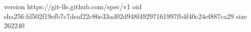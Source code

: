 version https://git-lfs.github.com/spec/v1
oid sha256:fd502f19efb7c7deaf22c86e33ad02d948f49297161997fb4f40c24ef887ca29
size 262240
